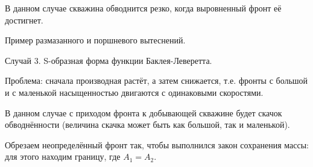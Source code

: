 \documentclass[main.tex]{subfiles}
\begin{document}
В данном случае скважина обводнится резко, когда выровненный фронт её достигнет.


Пример размазанного и поршневого вытеснений.


Случай 3. S-образная форма функции Баклея-Леверетта.

Проблема: сначала производная растёт, а затем снижается, т.е. фронты с большой и с маленькой насыщенностью двигаются с одинаковыми скоростями.


В данном случае с приходом фронта к добывающей скважине будет скачок обводнённости (величина скачка может быть как большой, так и маленькой).



Обрезаем неопределённый фронт так, чтобы выполнился закон сохранения массы: для этого находим границу, где $A_1=A_2$.

\end{document}
